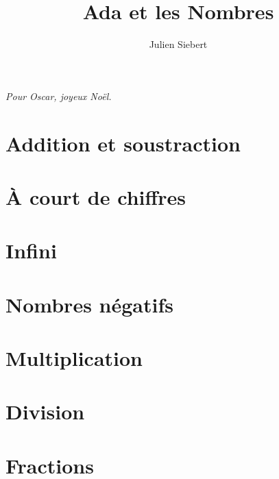 \documentclass[a5paper,11pt,onecolumn]{book}
\title{Ada et les Nombres}
\author{Julien Siebert}
\begin{document}
\maketitle
\textit{Pour Oscar, joyeux Noël.}
\chapter{}

\chapter{Addition et soustraction}

\chapter{À court de chiffres}

\chapter{Infini}

\chapter{Nombres négatifs}

\chapter{Multiplication}

\chapter{Division}

\chapter{Fractions}

\end{document}
